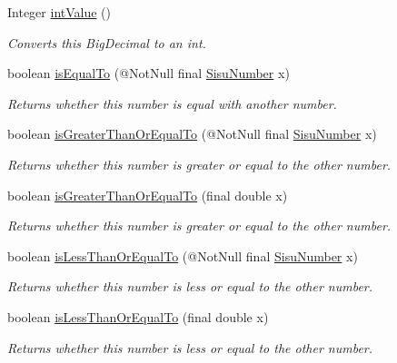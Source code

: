 \begin{DoxyCompactItemize}
Integer \hyperlink{classcom_1_1aarrelaakso_1_1drawl_1_1_sisu_number_aa47667c48867cb223722df6facb0da42}{int\+Value} ()
\begin{DoxyCompactList}\small\item\em Converts this Big\+Decimal to an int. \end{DoxyCompactList}\item 
boolean \hyperlink{classcom_1_1aarrelaakso_1_1drawl_1_1_sisu_number_a155f10efc361b9c5b3baf64604aba9f0}{is\+Equal\+To} (@Not\+Null final \hyperlink{classcom_1_1aarrelaakso_1_1drawl_1_1_sisu_number}{Sisu\+Number} x)
\begin{DoxyCompactList}\small\item\em Returns whether this number is equal with another number. \end{DoxyCompactList}\item 
boolean \hyperlink{classcom_1_1aarrelaakso_1_1drawl_1_1_sisu_number_ac64e4cbed7b630a61fa7707a4dbcbd68}{is\+Greater\+Than\+Or\+Equal\+To} (@Not\+Null final \hyperlink{classcom_1_1aarrelaakso_1_1drawl_1_1_sisu_number}{Sisu\+Number} x)
\begin{DoxyCompactList}\small\item\em Returns whether this number is greater or equal to the other number. \end{DoxyCompactList}\item 
boolean \hyperlink{classcom_1_1aarrelaakso_1_1drawl_1_1_sisu_number_a62cf6cef49aa597e48a87ecd9b37650e}{is\+Greater\+Than\+Or\+Equal\+To} (final double x)
\begin{DoxyCompactList}\small\item\em Returns whether this number is greater or equal to the other number. \end{DoxyCompactList}\item 
boolean \hyperlink{classcom_1_1aarrelaakso_1_1drawl_1_1_sisu_number_a58e0ccfb02e7bf83e7c2773e5dc94797}{is\+Less\+Than\+Or\+Equal\+To} (@Not\+Null final \hyperlink{classcom_1_1aarrelaakso_1_1drawl_1_1_sisu_number}{Sisu\+Number} x)
\begin{DoxyCompactList}\small\item\em Returns whether this number is less or equal to the other number. \end{DoxyCompactList}\item 
boolean \hyperlink{classcom_1_1aarrelaakso_1_1drawl_1_1_sisu_number_a540f0064d0baf65b1f783758bb2b5e2c}{is\+Less\+Than\+Or\+Equal\+To} (final double x)
\begin{DoxyCompactList}\small\item\em Returns whether this number is less or equal to the other number. \end{DoxyCompactList}\item 

\end{DoxyCompactItemize}
